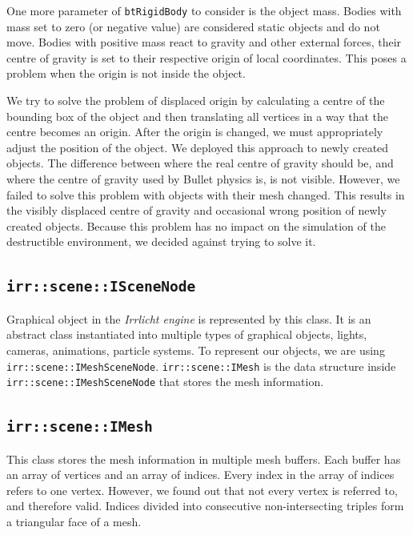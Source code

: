One more parameter of {\tt btRigidBody} to consider is the object mass. Bodies with mass set to zero (or negative value) are considered static objects and do not move. Bodies with positive mass react to gravity and other external forces, their centre of gravity is set to their respective origin of local coordinates. This poses a problem when the origin is not inside the object. 

We try to solve the problem of displaced origin by calculating a centre of the bounding box of the object and then translating all vertices in a way that the centre becomes an origin. After the origin is changed, we must appropriately adjust the position of the object. We deployed this approach to newly created objects. The difference between where the real centre of gravity should be, and where the centre of gravity used by Bullet physics is, is not visible. However, we failed to solve this problem with objects with their mesh changed. This results in the visibly displaced centre of gravity and occasional wrong position of newly created objects. Because this problem has no impact on the simulation of the destructible environment, we decided against trying to solve it.

\subsection*{\tt irr::scene::ISceneNode} 
Graphical object in the \emph{Irrlicht engine} is represented by this class. It is an abstract class instantiated into multiple types of graphical objects, \eg lights, cameras, animations, particle systems. To represent our objects, we are using {\tt irr::scene::IMeshSceneNode}. {\tt irr::scene::IMesh} is the data structure inside {\tt irr::scene::IMeshSceneNode} that stores the mesh information. 

\subsection*{\tt irr::scene::IMesh} 
This class stores the mesh information in multiple mesh buffers. Each buffer has an array of vertices and an array of indices. Every index in the array of indices refers to one vertex. However, we found out that not every vertex is referred to, and therefore valid. Indices divided into consecutive non-intersecting triples form a triangular face of a mesh. 

